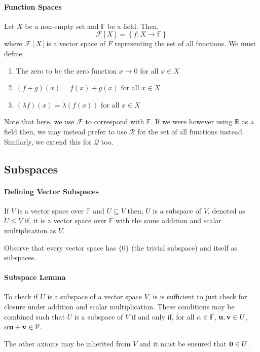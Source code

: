 \paragraph{Function Spaces}
Let \(X\) be a non-empty set and \(\mathbb{F}\) be a field.
Then,
\[
    \mathcal{F}[X] = \left\{ f : X\to \mathbb{F} \right\}
\]
where \(\mathcal{F}[X]\)is a vector space of \(F\) representing the
set of all functions.
We must define
\begin{enumerate}
    \item The zero to be the zero function \(x \to 0\) for all \(x\in X\)
    \item \((f + g)(x) = f(x) + g(x)\) for all \(x\in X\)
    \item \((\lambda f)(x) = \lambda(f(x))\) for all \(x\in X\)
\end{enumerate}

Note that here, we use \(\mathcal{F}\) to correspond with \(\mathbb{F}\).
If we were however using \(\mathbb{R}\) as a field then, we may instead
prefer to use \(\mathcal{R}\) for the set of all functions instead.
Similarly, we extend this for \(\mathcal{Q}\) too.

\subsection{Subspaces}

\paragraph{Defining Vector Subspaces}
If \(V\) is a vector space over \(\mathbb{F}\) and \(U\subseteq V\)
then, \(U\) is a subspace of \(V\), denoted as \(U \leq V\)
if, it is a vector space over \(\mathbb{F}\) with the same addition
and scalar multiplication as \(V\).

Observe that every vector space has \(\{0\}\) (the trivial subspace)
and itself as subspaces.

\paragraph{Subspace Lemma}
To check if \(U\) is a subspace of a vector space \(V\), is is sufficient
to just check for closure under addition and scalar multiplication.
These conditions may be combined such that \(U\) is a subspace of
\(V\) if and only if, for all \(\alpha \in \mathbb{F}\),
\(\mathbf{u}, \mathbf{v} \in U\), \(\alpha\mathbf{u} + \mathbf{v} \in \mathbb{F}\).

The other axioms may be inherited from \(V\) and it must be ensured that
\(\mathbf{0} \in U\).

